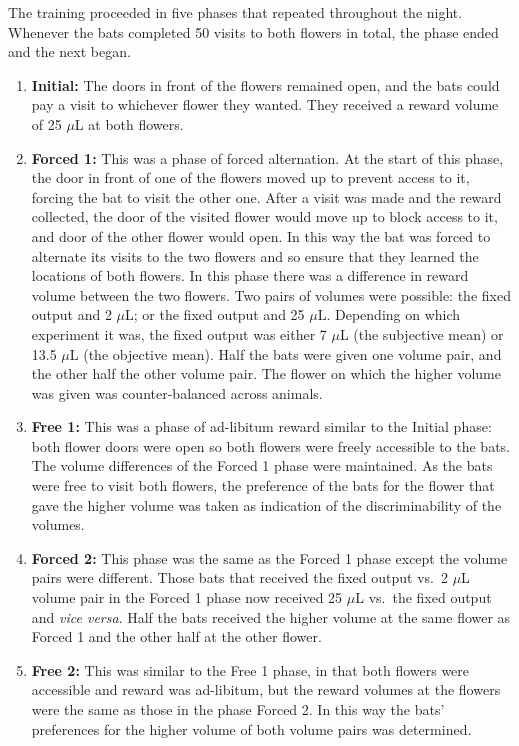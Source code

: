 \documentclass[
]{article}
\begin{document}
The training proceeded in five phases that repeated throughout the night. Whenever the bats completed 50 visits to both flowers in total, the phase ended and the next began.

\begin{enumerate}
\def\labelenumi{\arabic{enumi}.}
\item
  \textbf{Initial:} The doors in front of the flowers remained open, and the bats could pay a visit to whichever flower they wanted. They received a reward volume of 25 \(\mu\)L at both flowers.
\item
  \textbf{Forced 1:} This was a phase of forced alternation. At the start of this phase, the door in front of one of the flowers moved up to prevent access to it, forcing the bat to visit the other one. After a visit was made and the reward collected, the door of the visited flower would move up to block access to it, and door of the other flower would open. In this way the bat was forced to alternate its visits to the two flowers and so ensure that they learned the locations of both flowers. In this phase there was a difference in reward volume between the two flowers. Two pairs of volumes were possible: the fixed output and 2 \(\mu\)L; or the fixed output and 25 \(\mu\)L. Depending on which experiment it was, the fixed output was either 7 \(\mu\)L (the subjective mean) or 13.5 \(\mu\)L (the objective mean). Half the bats were given one volume pair, and the other half the other volume pair. The flower on which the higher volume was given was counter-balanced across animals.
\item
  \textbf{Free 1:} This was a phase of ad-libitum reward similar to the Initial phase: both flower doors were open so both flowers were freely accessible to the bats. The volume differences of the Forced 1 phase were maintained. As the bats were free to visit both flowers, the preference of the bats for the flower that gave the higher volume was taken as indication of the discriminability of the volumes.
\item
  \textbf{Forced 2:} This phase was the same as the Forced 1 phase except the volume pairs were different. Those bats that received the fixed output vs.~2 \(\mu\)L volume pair in the Forced 1 phase now received 25 \(\mu\)L vs.~the fixed output and \emph{vice versa}. Half the bats received the higher volume at the same flower as Forced 1 and the other half at the other flower.
\item
  \textbf{Free 2:} This was similar to the Free 1 phase, in that both flowers were accessible and reward was ad-libitum, but the reward volumes at the flowers were the same as those in the phase Forced 2. In this way the bats' preferences for the higher volume of both volume pairs was determined.
\end{enumerate}
\end{document}
